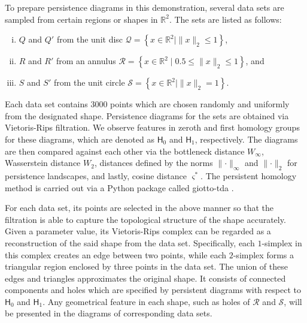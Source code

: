 \documentclass[sn-mathphys-num]{sn-jnl}%
\theoremstyle{thmstyleone}%
\theoremstyle{thmstyletwo}%
\theoremstyle{thmstylethree}%
\begin{document}
To prepare persistence diagrams in this demonstration, several data sets are sampled from certain regions or shapes in $\mathbb{R}^2$. The sets are listed as follows:
\begin{enumerate}[(i)]
\item $Q$ and $Q'$ from the unit disc $\mathcal{Q}=\left\{x \in \mathbb{R}^2 \mid\|x\|_2 \leq 1\right\}$,
\item $R$ and $R'$ from an annulus $\mathcal{R}=\left\{x \in \mathbb{R}^2 \mid 0.5 \leq\|x\|_2 \leq 1\right\}$, and
\item $S$ and $S'$ from the unit circle $\mathcal{S}=\left\{x \in \mathbb{R}^2 \mid\|x\|_2=1\right\}$.
\end{enumerate}

Each data set contains $3000$ points which are chosen randomly and uniformly from the designated shape. Persistence diagrams for the sets are obtained via Vietoris-Rips filtration. We observe features in zeroth and first homology groups for these diagrams, which are denoted as $\mathsf{H}_0$ and $\mathsf{H}_1$, respectively. The diagrams are then compared against each other via the bottleneck distance $W_{\infty}$, Wasserstein distance $W_2$, distances defined by the norms $\lVert\cdot\rVert_{\infty}$ and $\lVert\cdot\rVert_2$ for persistence landscapes, and lastly, cosine distance $\varsigma^*$. The persistent homology method is carried out via a Python package called giotto-tda \cite{Tauzin}.

For each data set, its points are selected in the above manner so that the filtration is able to capture the topological structure of the shape accurately. Given a parameter value, its Vietoris-Rips complex can be regarded as a reconstruction of the said shape from the data set. Specifically, each $1$-simplex in this complex creates an edge between two points, while each $2$-simplex forms a triangular region enclosed by three points in the data set. The union of these edges and triangles approximates the original shape. It consists of connected components and holes which are specified by persistent diagrams with respect to $\mathsf{H}_0$ and $\mathsf{H}_1$. Any geometrical feature in each shape, such as holes of $\mathcal{R}$ and $\mathcal{S}$, will be presented in the diagrams of corresponding data sets.
\end{document}
